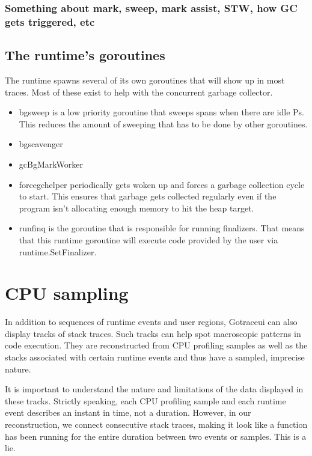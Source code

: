 \documentclass[10pt,letterpaper,oneside,openany,showtrims,draft]{memoir}
\newcommand{\code}[1]{{\ttfamily\mbox{#1}}}
\newcommand{\todo}[1]{{\color{red}#1}}
\begin{document}
\subsection{\todo{Something about mark, sweep, mark assist, STW, how GC gets triggered, etc}}

\section{The runtime's goroutines}
The runtime spawns several of its own goroutines that will show up in most traces.
Most of these exist to help with the concurrent garbage collector.

\begin{itemize}
\item \code{bgsweep} is a low priority goroutine that sweeps spans when there are idle Ps. This reduces the amount
  of sweeping that has to be done by other goroutines.
\item \todo{bgscavenger}
\item \todo{gcBgMarkWorker}
\item \code{forcegchelper} periodically gets woken up and forces a garbage collection cycle to start.
  This ensures that garbage gets collected regularly even if the program isn't allocating enough memory to hit the heap target.
\item \code{runfinq} is the goroutine that is responsible for running finalizers.
  That means that this runtime goroutine will execute code provided by the user via \code{runtime.SetFinalizer}.
\end{itemize}



\chapter{CPU sampling}\label{cpu-sampling}
In addition to sequences of runtime events and user regions, Gotraceui can also display tracks of stack traces.
Such tracks can help spot macroscopic patterns in code execution.
They are reconstructed from CPU profiling samples as well as the stacks associated with certain runtime events and thus have a sampled,
imprecise nature.


It is important to understand the nature and limitations of the data displayed in these tracks.
Strictly speaking, each CPU profiling sample and each runtime event describes an instant in time, not a duration.
However, in our reconstruction, we connect consecutive stack traces,
making it look like a function has been running for the entire duration between two events or samples.
This is a lie.
\end{document}
